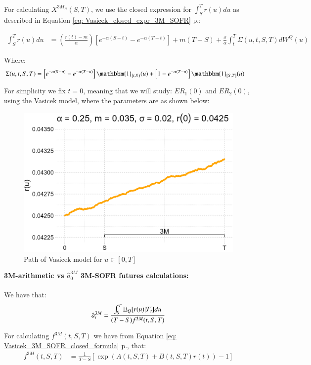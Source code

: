 For calculating $X^{3M_{A}}(S,T)$, we use the closed expression for $\int_{S}^{T}r(u)du$  as described in Equation \ref{eq: Vasicek_closed_expr_3M_SOFR} p.\pageref{eq: Vasicek_closed_expr_3M_SOFR}:

\begin{align*}
\int_{S}^{T}r(u)du 
&= 
\left(
\frac{r(t)-m}{\alpha}
\right)
\left[
e^{-\alpha(S-t)} - e^{-\alpha(T-t)}
\right]
+ m(T-S) 
+ 
\frac{\sigma}{\alpha}\int_{t}^{T}\Sigma(u,t,S,T)dW^{Q}(u)
\end{align*}

Where: 
\begin{align*}
\Sigma(u,t,S,T) &= 
\left[
e^{-\alpha(S-u)}-e^{-\alpha(T-u)}
\right]\mathbbm{1}_{[t,S)}(u) 
+ 
\left[
1-e^{-\alpha(T-u)}
\right]\mathbbm{1}_{[S,T]}(u)
\end{align*}


For simplicity we fix $t=0$, meaning that we will study: 
$ER_{1}(0)$ and $ER_{2}(0)$, using the Vasicek model, where the parameters are as shown below:

\begin{figure}[htp]
    \centering
    \includegraphics[width=12cm]{figures/SOFR/Vasicek_path.png}
    \caption{Path of Vasicek model for $u\in [0,T]$}
    \label{fig: Vasicek_path}
\end{figure}

\newpage 
\textbf{3M-arithmetic vs $\hat{a}_{0}^{3M}$ 3M-SOFR futures calculations:}
\\~\\
We have that: 
\begin{align*}
\hat{a}_{t}^{3M} = \frac{
\int_{S}^{T}\mathbb{E}_{Q}[r(u)|\mathcal{F}_{t}]du
}{
(T-S)f^{3M}(t,S,T)
}    
\end{align*}

For calculating $f^{3M}(t,S,T)$ we have from 
Equation \ref{eq: Vasicek_3M_SOFR_closed_formula} p.\pageref{eq: Vasicek_3M_SOFR_closed_formula}, that:  
\begin{align*}
f^{3M}(t,S,T) &= 
\frac{1}{T-S}\left[
\exp\left(
A(t,S,T) + B(t,S,T)r(t)
\right)
-1
\right]
\end{align*}

